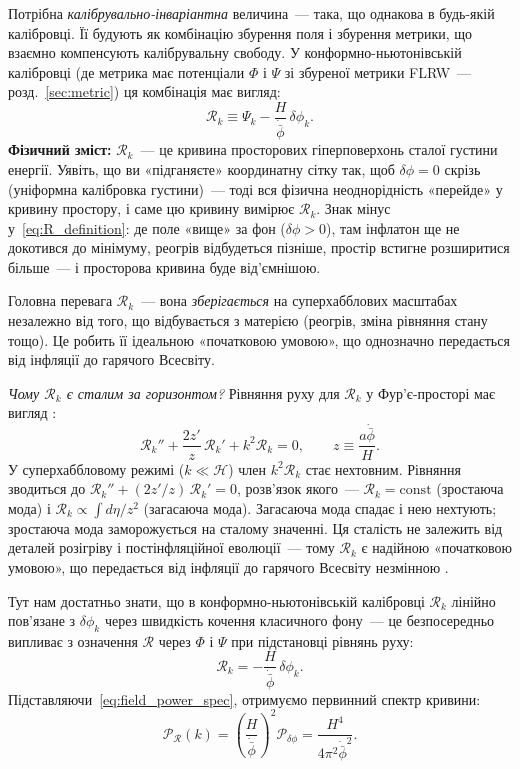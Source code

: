 Потрібна \emph{калібрувально-інваріантна} величина~---
така, що однакова в будь-якій калібровці.
Її будують як комбінацію збурення поля і збурення метрики,
що взаємно компенсують калібрувальну свободу.
У конформно-ньютонівській калібровці (де метрика має потенціали
$\Phi$ і $\Psi$ зі збуреної метрики FLRW~--- розд.~\ref{sec:metric})
ця комбінація має вигляд:
\begin{equation}\label{eq:R_definition}
  \mathcal{R}_k \equiv \Psi_k - \frac{H}{\dot{\bar\phi}}\,\delta\phi_k.
\end{equation}
\textbf{Фізичний зміст:} $\mathcal{R}_k$~--- це кривина просторових
гіперповерхонь сталої густини енергії.
Уявіть, що ви «підганяєте» координатну сітку так, щоб
$\delta\phi = 0$ скрізь (уніформна калібровка густини)~---
тоді вся фізична неоднорідність «перейде» у кривину простору,
і саме цю кривину вимірює $\mathcal{R}_k$.
Знак мінус у~\eqref{eq:R_definition}: де поле «вище» за фон
($\delta\phi > 0$), там інфлатон ще не докотився до мінімуму,
реогрів відбудеться пізніше, простір встигне розширитися більше~---
і просторова кривина буде від'ємнішою.

Головна перевага $\mathcal{R}_k$~--- вона \emph{зберігається}
на суперхабблових масштабах незалежно від того, що відбувається
з матерією (реогрів, зміна рівняння стану тощо).
Це робить її ідеальною «початковою умовою», що однозначно
передається від інфляції до гарячого Всесвіту.

\textit{Чому $\mathcal{R}_k$ є сталим за горизонтом?}
Рівняння руху для $\mathcal{R}_k$ у Фур'є-просторі має вигляд
\cite{bardeen_1980}:
\begin{equation}\label{eq:R_eom}
  \mathcal{R}_k'' + \frac{2z'}{z}\,\mathcal{R}_k' + k^2\mathcal{R}_k = 0,
  \qquad z \equiv \frac{a\dot{\bar\phi}}{H}.
\end{equation}
У суперхаббловому режимі ($k \ll \mathcal{H}$) член $k^2\mathcal{R}_k$
стає нехтовним. Рівняння зводиться до
$\mathcal{R}_k'' + (2z'/z)\,\mathcal{R}_k' = 0$,
розв'язок якого~--- $\mathcal{R}_k = \mathrm{const}$ (зростаюча мода)
і $\mathcal{R}_k \propto \int d\eta/z^2$ (загасаюча мода).
Загасаюча мода спадає і нею нехтують; зростаюча мода заморожується
на сталому значенні. Ця сталість не залежить від деталей розігріву і
постінфляційної еволюції~--- тому $\mathcal{R}_k$ є надійною
«початковою умовою», що передається від інфляції до гарячого
Всесвіту незмінною \cite{bardeen_1980}.

Тут нам достатньо знати, що в конформно-ньютонівській калібровці
$\mathcal{R}_k$ лінійно пов'язане з $\delta\phi_k$ через швидкість
кочення класичного фону~--- це безпосередньо випливає з означення
$\mathcal{R}$ через $\Phi$ і $\Psi$ при підстановці рівнянь руху:
\begin{equation}\label{eq:curvature_perturbation}
  \mathcal{R}_k = -\frac{H}{\dot{\bar{\phi}}}\,\delta\phi_k.
\end{equation}
Підставляючи~\eqref{eq:field_power_spec}, отримуємо первинний
спектр кривини:
\begin{equation}\label{eq:curvature_power_spec}
  \mathcal{P}_{\mathcal{R}}(k)
    = \left(\frac{H}{\dot{\bar{\phi}}}\right)^{\!2}
      \mathcal{P}_{\delta\phi}
    = \frac{H^4}{4\pi^2\dot{\bar{\phi}}^2}.
\end{equation}

